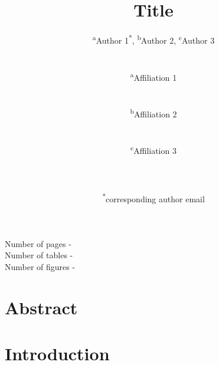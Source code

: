 \documentclass[11pt,a4paper]{article}
\begin{document}
\begin{titlepage}
    \title{Title}
    \author{
        \textsuperscript{a}Author 1\textsuperscript{*}, 
        \textsuperscript{b}Author 2, 
        \textsuperscript{c}Author 3
        \\ \\ \\
        \textsuperscript{a}Affiliation 1\\ 
        \\ \\
        \textsuperscript{b}Affiliation 2\\ 
        \\ \\
        \textsuperscript{c}Affiliation 3\\
        \\ \\ \\
        \textsuperscript{*}corresponding author email
    }
\clearpage %
\maketitle
\vspace*{\fill}
\begin{flushright}{
        \noindent Number of pages - \pageref{LastPage} \\
        \noindent Number of tables - \totaltables \\
        \noindent Number of figures - \totalfigures
}
\end{flushright}
\thispagestyle{empty} %
\end{titlepage}

\onehalfspacing %
\linenumbers %
\pagewiselinenumbers %
\modulolinenumbers[3] %

\section*{Abstract} \label{sec-abstract}

\newpage

\printnoidxglossary

\newpage

\section{Introduction} \label{sec-introduction}
\end{document}
